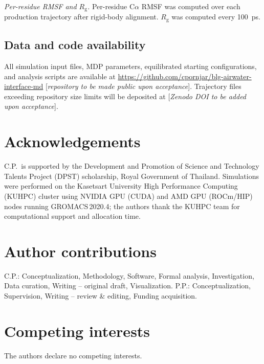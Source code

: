\documentclass[11pt,a4paper]{article}
\begin{document}
\textit{Per-residue RMSF and $R_\mathrm{g}$.} Per-residue C$\alpha$ RMSF
was computed over each production trajectory after rigid-body alignment.
$R_\mathrm{g}$ was computed every \SI{100}{\pico\second}.

\subsection*{Data and code availability}

All simulation input files, MDP parameters, equilibrated starting
configurations, and analysis scripts are available at
\url{https://github.com/cpornjar/blg-airwater-interface-md}
[\textit{repository to be made public upon acceptance}]. Trajectory
files exceeding repository size limits will be deposited at
[\textit{Zenodo DOI to be added upon acceptance}].

\section*{Acknowledgements}
C.P.\ is supported by the Development and Promotion of Science and
Technology Talents Project (DPST) scholarship, Royal Government of
Thailand. Simulations were performed on the Kasetsart University High
Performance Computing (KUHPC) cluster using NVIDIA GPU (CUDA) and
AMD GPU (ROCm/HIP) nodes running GROMACS\,2020.4; the authors thank
the KUHPC team for computational support and allocation time.

\section*{Author contributions}
C.P.: Conceptualization, Methodology, Software, Formal analysis,
Investigation, Data curation, Writing -- original draft, Visualization.
P.P.: Conceptualization, Supervision, Writing -- review \& editing,
Funding acquisition.

\section*{Competing interests}
The authors declare no competing interests.


\end{document}
